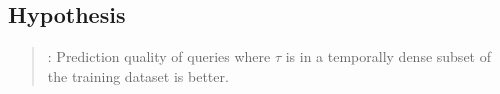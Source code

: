 \addtocounter{hcounter}{1}
\subsection{Hypothesis \thehcounter} %
\label{sec:hypothesis_\thehcounter}

\begin{quote}
:
Prediction quality of queries where $\tau$ is in a temporally dense subset of the training dataset is better.
\end{quote}